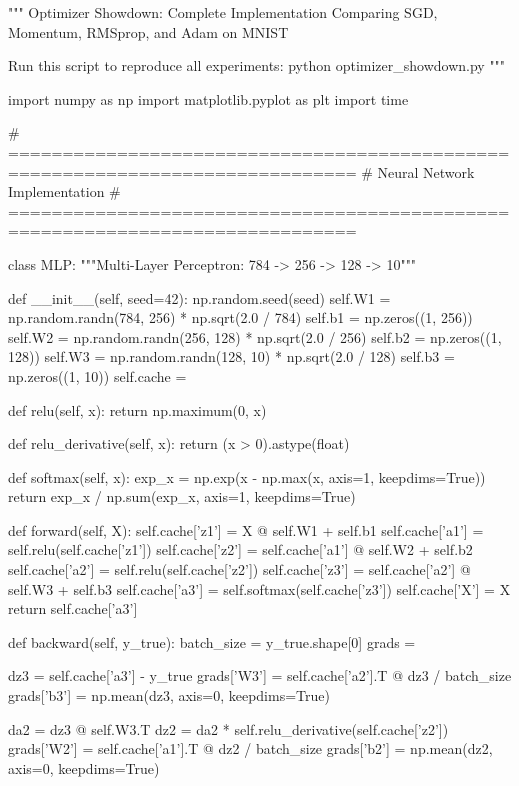 \documentclass[../../main.tex]{subfiles}
\begin{document}
\begin{pythoncode}
"""
Optimizer Showdown: Complete Implementation
Comparing SGD, Momentum, RMSprop, and Adam on MNIST

Run this script to reproduce all experiments:
    python optimizer_showdown.py
"""

import numpy as np
import matplotlib.pyplot as plt
import time


# ==============================================================================
# Neural Network Implementation
# ==============================================================================

class MLP:
    """Multi-Layer Perceptron: 784 -> 256 -> 128 -> 10"""

    def __init__(self, seed=42):
        np.random.seed(seed)
        self.W1 = np.random.randn(784, 256) * np.sqrt(2.0 / 784)
        self.b1 = np.zeros((1, 256))
        self.W2 = np.random.randn(256, 128) * np.sqrt(2.0 / 256)
        self.b2 = np.zeros((1, 128))
        self.W3 = np.random.randn(128, 10) * np.sqrt(2.0 / 128)
        self.b3 = np.zeros((1, 10))
        self.cache = {}

    def relu(self, x):
        return np.maximum(0, x)

    def relu_derivative(self, x):
        return (x > 0).astype(float)

    def softmax(self, x):
        exp_x = np.exp(x - np.max(x, axis=1, keepdims=True))
        return exp_x / np.sum(exp_x, axis=1, keepdims=True)

    def forward(self, X):
        self.cache['z1'] = X @ self.W1 + self.b1
        self.cache['a1'] = self.relu(self.cache['z1'])
        self.cache['z2'] = self.cache['a1'] @ self.W2 + self.b2
        self.cache['a2'] = self.relu(self.cache['z2'])
        self.cache['z3'] = self.cache['a2'] @ self.W3 + self.b3
        self.cache['a3'] = self.softmax(self.cache['z3'])
        self.cache['X'] = X
        return self.cache['a3']

    def backward(self, y_true):
        batch_size = y_true.shape[0]
        grads = {}

        dz3 = self.cache['a3'] - y_true
        grads['W3'] = self.cache['a2'].T @ dz3 / batch_size
        grads['b3'] = np.mean(dz3, axis=0, keepdims=True)

        da2 = dz3 @ self.W3.T
        dz2 = da2 * self.relu_derivative(self.cache['z2'])
        grads['W2'] = self.cache['a1'].T @ dz2 / batch_size
        grads['b2'] = np.mean(dz2, axis=0, keepdims=True)


\end{pythoncode}
\end{document}
